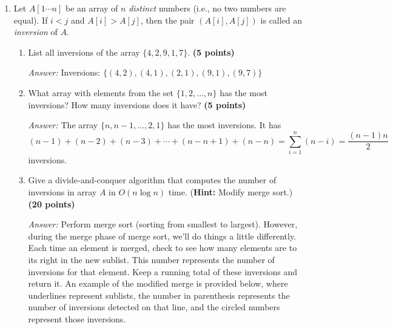 \documentclass[11pt]{article}
\begin{document}
\begin{enumerate}



\item
Let $A[1\cdots n]$ be an array of $n$ {\em distinct} numbers (i.e., no two
numbers are equal). If $i<j$ and $A[i]>A[j]$, then the pair
$(A[i],A[j])$ is called an {\em inversion} of $A$.

\begin{enumerate}
\item
	List all inversions of the array $\{ 4,2,9,1,7\}$. {\hfill \bf (5 points)}
	
    \textit{Answer:} Inversions: $\{(4,2),(4,1),(2,1),(9,1),(9,7)\}$
    
\item
	What array with elements from the set $\{1,2,\ldots,n\}$ has the
	most inversions? How many inversions does it have?
	{\hfill \bf (5 points)}
    
    \textit{Answer:} The array $\{n, n - 1,\ldots,2,1\}$ has the most inversions. It has
    \[(n-1)+(n-2)+(n-3)+\cdots+(n-n+1)+(n-n) = \sum_{i=1}^n(n-i) = \frac{(n-1)n}{2}\] inversions.

\item
	Give a divide-and-conquer algorithm that computes the number of
	inversions in array $A$ in $O(n\log n)$
	time. ({\bf Hint:} Modify merge sort.)	{\hfill \bf (20 points)}
    
    \textit{Answer:} Perform merge sort (sorting from smallest to largest). However, during the merge phase of merge sort, we'll do things 
    a little differently. Each time an element is merged, check to see how many elements are to its right in the new sublist. This number
    represents the number of inversions for that element. Keep a running total of these inversions and return it. An example of the
    modified merge is provided below, where underlines represent sublists, the number in parenthesis represents the number of inversions
    detected on that line, and the circled numbers represent those inversions.
    

\end{enumerate}
\end{enumerate}
\end{document}
